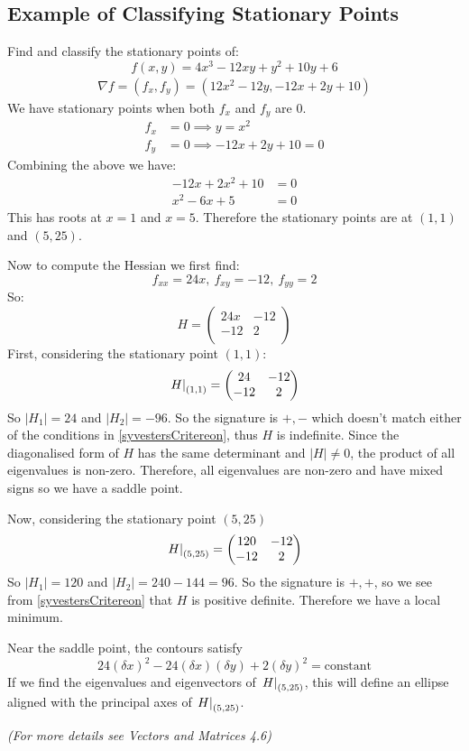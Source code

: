 \documentclass[../main.tex]{subfiles}
\begin{document}
\subsection{Example of Classifying Stationary Points}
\begin{example}
  Find and classify the stationary points of:
  \[
    f(x, y) = 4x^3 - 12xy + y^2 + 10y+ 6
  \]
  \begin{align*}
    \nabla f = (f_x, f_y) = (12x^2 - 12y, -12x + 2y + 10)
  \end{align*}
  We have stationary points when both $f_x$ and $f_y$ are 0.
  \begin{align*}
    f_x &= 0 \implies y = x^2 \\
    f_y &= 0 \implies -12x + 2y + 10 = 0
  \end{align*}
  Combining the above we have:
  \begin{align*}
    -12x + 2x^2 + 10 &= 0 \\
    x^2 - 6x + 5 &= 0
  \end{align*}
  This has roots at $x = 1$ and $x = 5$.
  Therefore the stationary points are at $(1, 1)$ and $(5, 25)$.

  Now to compute the Hessian we first find:
  \[
    f_{x x} = 24x,\ f_{x y} = -12,\ f_{y y} = 2
  \]
  So:
  \[
    H = \begin{pmatrix}
    24x & -12 \\
    -12 & 2 \\
    \end{pmatrix}
  \]
  First, considering the stationary point $(1, 1)$:
  \[
    \left. H \right|_{(1, 1)} = \begin{pmatrix}
    24 & -12 \\
    -12 & 2 \\
    \end{pmatrix}
  \]
  So $|H_1| = 24$ and $|H_2| = -96$.
  So the signature is $+, -$ which doesn't match either of the conditions in \cref{syvestersCritereon}, thus $H$ is indefinite.
  Since the diagonalised form of $H$ has the same determinant and $|H| \neq 0$, the product of all eigenvalues is non-zero.
  Therefore, all eigenvalues are non-zero and have mixed signs so we have a saddle point.

  Now, considering the stationary point $(5, 25)$
  \[
    \left. H \right|_{(5, 25)} = \begin{pmatrix}
    120 & -12 \\
    -12 & 2 \\
    \end{pmatrix}
  \]
  So $|H_1| = 120$ and $|H_2| = 240 - 144 = 96$.
  So the signature is $+, +$, so we see from \cref{syvestersCritereon} that $H$ is positive definite.
  Therefore we have a local minimum.

  Near the saddle point, the contours satisfy
  \[
    24(\delta x)^2 - 24(\delta x)(\delta y) + 2(\delta y)^2 = \text{constant}
  \]
  If we find the eigenvalues and eigenvectors of $\left. H \right|_{(5, 25)}$, this will define an ellipse aligned with the principal axes of $\left. H \right|_{(5, 25)}$.

\textit{(For more details see Vectors and Matrices 4.6)}
\end{example}
\end{document}
